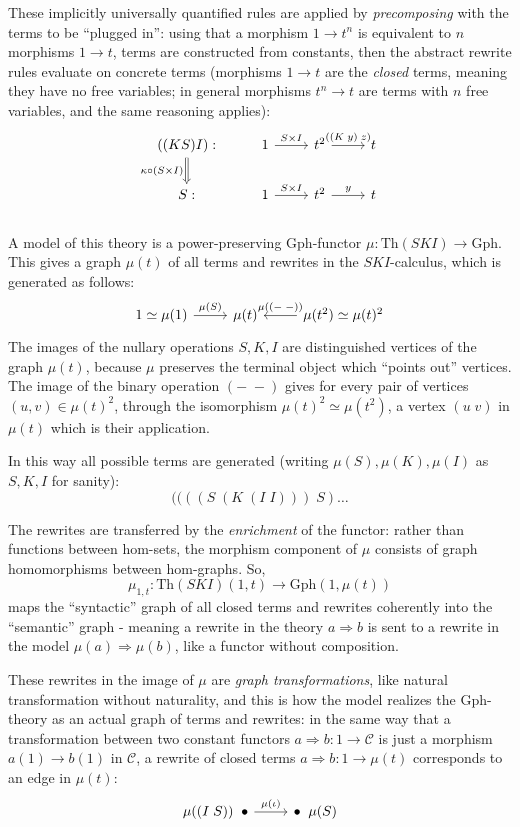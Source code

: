 \documentclass[a4paper,UKenglish]{article}
\theoremstyle{definition}
\newcommand{\Th}{\mathrm{Th}}
\newcommand{\Gph}{\mathrm{Gph}}
\newcommand{\C}{\mathscr{C}}
\begin{document}
These implicitly universally quantified rules are applied by \textit{precomposing} with the terms to be ``plugged in'': using that a morphism $1 \to t^n$ is equivalent to $n$ morphisms $1 \to t$, terms are constructed from constants, then the abstract rewrite rules evaluate on concrete terms (morphisms $1\to t$ are the \textit{closed} terms, meaning they have no free variables; in general morphisms $t^n\to t$ are terms with $n$ free variables, and the same reasoning applies):
\[\begin{tikzcd}
	((KS)I): \arrow[Rightarrow,d,swap,"\kappa \circ (S\times I)"] & 1 \arrow[r,"S\times I"] & t^2 \arrow[r,"((K\; y)\; z)"] & t\\
	S: & 1 \arrow[r,"S\times I"] & t^2 \arrow[r,"y"] & t
\end{tikzcd}\]\\

A model of this theory is a power-preserving $\Gph$-functor $\mu: \Th(SKI) \to \Gph$. This gives a graph $\mu(t)$ of all terms and rewrites in the $SKI$-calculus, which is generated as follows:
\[\begin{tikzcd}
1 \simeq \mu(1) \arrow[r,"\mu(S)"] & \mu(t) & \mu(t^2) \arrow[l,swap,"\mu(\left(-\;-\right))"] \simeq \mu(t)^2
\end{tikzcd}\]
The images of the nullary operations $S,K,I$ are distinguished vertices of the graph $\mu(t)$, because $\mu$ preserves the terminal object which ``points out'' vertices. The image of the binary operation $(-\; -)$ gives for every pair of vertices $(u,v) \in \mu(t)^2$, through the isomorphism $\mu(t)^2 \simeq \mu(t^2)$, a vertex $(u\; v)$ in $\mu(t)$ which is their application.

In this way all possible terms are generated (writing $\mu(S),\mu(K),\mu(I)$ as $S,K,I$ for sanity): $$((((S\; (K\; (I\; I)))\; S) \dots$$

The rewrites are transferred by the \textit{enrichment} of the functor: rather than functions between hom-sets, the morphism component of $\mu$ consists of graph homomorphisms between hom-graphs. So, $$\mu_{1,t}: \Th(SKI)(1,t)\to \Gph(1,\mu(t))$$ maps the ``syntactic'' graph of all closed terms and rewrites coherently into the ``semantic'' graph - meaning a rewrite in the theory $a\Rightarrow b$ is sent to a rewrite in the model $\mu(a) \Rightarrow \mu(b)$, like a functor without composition.

These rewrites in the image of $\mu$ are \textit{graph transformations}, like natural transformation without naturality, and this is how the model realizes the $\Gph$-theory as an actual graph of terms and rewrites: in the same way that a transformation between two constant functors $a\Rightarrow b: 1\to \C$ is just a morphism $a(1)\to b(1)$ in $\C$, a rewrite of closed terms $a\Rightarrow b: 1\to \mu(t)$ corresponds to an edge in $\mu(t)$:
\[\begin{tikzcd}
	\mu((I\; S)) \;\; \bullet \arrow[r,"\mu(\iota)"] & \bullet \;\; \mu(S)
\end{tikzcd}\]
\end{document}
